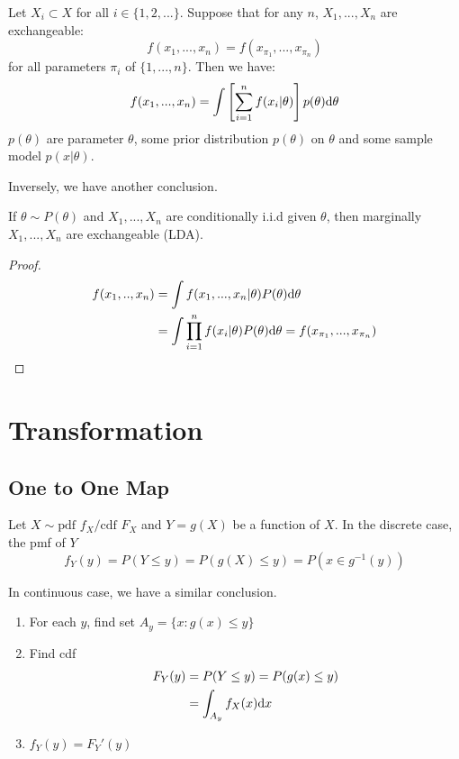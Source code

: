 	\begin{theorem}[De Finetti]
		Let $X_i\subset X$ for all $i\in\{1,2,...\}$. Suppose that for any $n$, $X_1,..., X_n$ are exchangeable:
		$$f(x_1,...,x_n) = f(x_{\pi_1},...,x_{\pi_n})$$
		for all parameters $\pi_i$ of $\{1,...,n\}$. Then we have:
		$$f(x_1,...,x_n) = \int\left[\sum_{i=1}^{n}f(x_i|\theta)\right]p(\theta)\mathrm{d} \theta$$
		$p(\theta)$ are parameter $\theta$, some prior distribution $p(\theta)$ on $\theta$ and some sample model $p(x|\theta)$.
	\end{theorem}
	Inversely, we have another conclusion.
	\begin{theorem}
		If $\theta \sim P(\theta)$ and $X_1,...,X_n$ are conditionally i.i.d given $\theta$, then marginally $X_1,...,X_n$ are exchangeable (LDA).
	\end{theorem}
	\begin{proof}
		\begin{align*}
			f(x_1,..,x_n) & = \int f(x_1, ..., x_n|\theta)P(\theta)\mathrm{d} \theta\\
			& = \int \prod\limits_{i=1}^{n}f(x_i|\theta)P(\theta)\mathrm{d}\theta = f(x_{\pi_1},...,x_{\pi_n})
		\end{align*}
	\end{proof}	

	\section{Transformation}
		\subsection{One to One Map}
	\begin{theorem}
		Let $X\sim \text{pdf }f_X/\text{cdf }F_X$ and $Y=g(X)$ be a function of $X$.
		In the discrete case, the pmf of $Y$
		$$f_Y(y) = P(Y\leq y) = P(g(X)\leq y) = P(x\in g^{-1}(y))$$
		
		In continuous case, we have a similar conclusion.
		\begin{enumerate}[(1)]
			\item For each $y$, find set $A_y = \{x: g(x)\leq y\}$
			\item Find cdf
				\begin{align*}
					F_Y(y) & = P(Y\leq y) = P(g(x)\leq y)\\
					& = \int_{A_y}f_X(x)\mathrm{d} x  
				\end{align*}
			\item $f_Y(y) = F_Y'(y)$
		\end{enumerate}
	\end{theorem}
	
